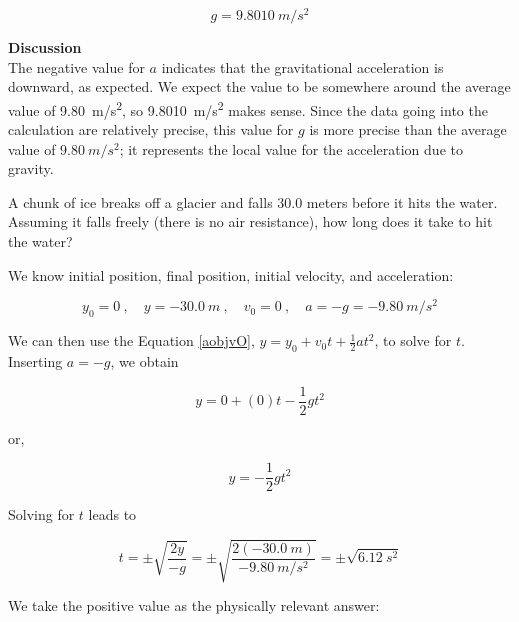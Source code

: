 \documentclass[../../main-ap-physics.tex]{subfiles}
\begin{document}
\begin{equation*}
    g = \SI{9.8010}{m/s^2}
\end{equation*}

\textbf{Discussion}\\
The negative value for $a$ indicates that the gravitational acceleration is downward, as expected. We expect the value to be somewhere around the average value of \SI{9.80}{m/s^2}, so \SI{9.8010}{m/s^2} makes sense. Since the data going into the calculation are relatively precise, this value for $g$ is more precise than the average value of $\SI{9.80}{m/s^2}$; it represents the local value for the acceleration due to gravity.

\vspace{1em}

\endsolution

\begin{example}
    A chunk of ice breaks off a glacier and falls 30.0 meters before it hits the water. Assuming it falls freely (there is no air resistance), how long does it take to hit the water?
\end{example}

\Solution We know initial position, final position, initial velocity, and acceleration:

\begin{equation*}
    y_0 = 0\ , \quad
    y = \SI{-30.0}{m}\ , \quad
    v_0 = 0\ , \quad
    a = -g = -\SI{9.80}{m/s^2}
\end{equation*}

We can then use the Equation \eqref{aobjvO}, $y = y_0 + v_0 t + \frac{1}{2} a t^2$, to solve for $t$. Inserting $a = -g$, we obtain

\begin{equation*}
    y = 0 + (0) t - \frac{1}{2} g t^2
\end{equation*}

or,

\begin{equation*}
    y = -\frac{1}{2} g t^2
\end{equation*}

Solving for $t$ leads to 

\begin{equation*}
    t = \pm \sqrt{\frac{2y}{-g}} = \pm \sqrt{\frac{2\left(-\SI{30.0}{m}\right)}{-\SI{9.80}{m/s^2}}} = \pm \sqrt{\SI{6.12}{s^2}}
\end{equation*}

We take the positive value as the physically relevant answer:
\end{document}

